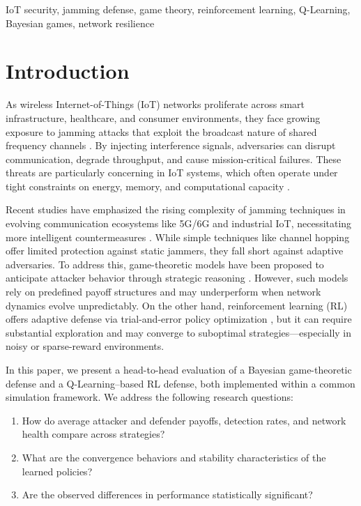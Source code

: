 \documentclass[conference]{IEEEtran}
\begin{document}
\begin{IEEEkeywords}
IoT security, jamming defense, game theory, reinforcement learning, Q-Learning, Bayesian games, network resilience
\end{IEEEkeywords}

\section{Introduction}

As wireless Internet-of-Things (IoT) networks proliferate across smart infrastructure, healthcare, and consumer environments, they face growing exposure to jamming attacks that exploit the broadcast nature of shared frequency channels \cite{survey2022jamming}. By injecting interference signals, adversaries can disrupt communication, degrade throughput, and cause mission-critical failures. These threats are particularly concerning in IoT systems, which often operate under tight constraints on energy, memory, and computational capacity \cite{singh2023bayesian}.

Recent studies have emphasized the rising complexity of jamming techniques in evolving communication ecosystems like 5G/6G and industrial IoT, necessitating more intelligent countermeasures \cite{lohan2024ai, bensaad2023jamming}. While simple techniques like channel hopping offer limited protection against static jammers, they fall short against adaptive adversaries. To address this, game-theoretic models have been proposed to anticipate attacker behavior through strategic reasoning \cite{jia2022game}. However, such models rely on predefined payoff structures and may underperform when network dynamics evolve unpredictably. On the other hand, reinforcement learning (RL) offers adaptive defense via trial-and-error policy optimization \cite{tang2024adaptive}, but it can require substantial exploration and may converge to suboptimal strategies—especially in noisy or sparse-reward environments.

In this paper, we present a head-to-head evaluation of a Bayesian game-theoretic defense and a Q-Learning–based RL defense, both implemented within a common simulation framework. We address the following research questions:
\begin{enumerate}
  \item How do average attacker and defender payoffs, detection rates, and network health compare across strategies?  
  \item What are the convergence behaviors and stability characteristics of the learned policies?  
  \item Are the observed differences in performance statistically significant?  
\end{enumerate}
\end{document}
